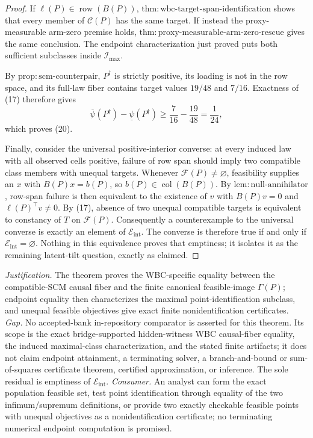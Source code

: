 \documentclass{article}
\begin{document}
\begin{proof}
If \(\ell(P)\in\operatorname{row}(B(P))\),
\(\mathrm{thm{:}wbc\text{-}target\text{-}span\text{-}identification}\)
shows that every member of \(\mathcal C(P)\) has the same target.  If instead
the proxy-measurable arm-zero premise holds,
\(\mathrm{thm{:}proxy\text{-}measurable\text{-}arm\text{-}zero\text{-}rescue}\)
gives the same conclusion.  The endpoint characterization just proved puts
both sufficient subclasses inside \(\mathcal I_{\max}\).

By \(\mathrm{prop{:}scm\text{-}counterpair}\), \(P^{\dagger}\) is strictly
positive, its loading is not in the row space, and its full-law fiber contains
target values \(19/48\) and \(7/16\).  Exactness of (17) therefore gives
\[
 \overline\psi(P^{\dagger})-\underline\psi(P^{\dagger})
 \ge \frac7{16}-\frac{19}{48}=\frac1{24},
\]
which proves (20).

Finally, consider the universal positive-interior converse: at every induced
law with all observed cells positive, failure of row span should imply two
compatible class members with unequal targets.  Whenever
\(\mathcal F(P)\ne\varnothing\), feasibility supplies an \(x\) with
\(B(P)x=b(P)\), so \(b(P)\in\operatorname{col}(B(P))\).  By
\(\mathrm{lem{:}null\text{-}annihilator}\), row-span failure is then
equivalent to the existence of \(v\) with
\(B(P)v=0\) and \(\ell(P)^{\top}v\ne0\).  By (17), absence of two unequal
compatible targets is equivalent to constancy of \(T\) on
\(\mathcal F(P)\).  Consequently a counterexample to the universal converse
is exactly an element of \(\mathcal E_{\mathrm{int}}\).  The converse is
therefore true if and only if \(\mathcal E_{\mathrm{int}}=\varnothing\).
Nothing in this equivalence proves that emptiness; it isolates it as the
remaining latent-tilt question, exactly as claimed.
\end{proof}
\par\smallskip\noindent \textit{Justification.} The theorem proves the WBC-specific equality between the compatible-SCM causal fiber and the finite canonical feasible-image \(\Gamma(P)\); endpoint equality then characterizes the maximal point-identification subclass, and unequal feasible objectives give exact finite nonidentification certificates. \textit{Gap.} No accepted-bank in-repository comparator is asserted for this theorem. Its scope is the exact bridge-supported hidden-witness WBC causal-fiber equality, the induced maximal-class characterization, and the stated finite artifacts; it does not claim endpoint attainment, a terminating solver, a branch-and-bound or sum-of-squares certificate theorem, certified approximation, or inference. The sole residual is emptiness of \(\mathcal E_{\mathrm{int}}\). \textit{Consumer.} An analyst can form the exact population feasible set, test point identification through equality of the two infimum/supremum definitions, or provide two exactly checkable feasible points with unequal objectives as a nonidentification certificate; no terminating numerical endpoint computation is promised.
\end{document}
